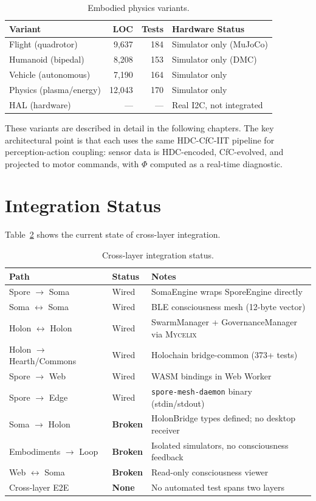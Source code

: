 \documentclass[12pt]{book}
\newcommand{\mycelix}{\textsc{Mycelix}}
\begin{document}
\begin{table}[H]
\centering
\caption{Embodied physics variants.}
\label{tab:embodied-variants}
\begin{tabular}{lrrl}
\toprule
\textbf{Variant} & \textbf{LOC} & \textbf{Tests} & \textbf{Hardware Status} \\
\midrule
Flight (quadrotor) & 9,637 & 184 & Simulator only (MuJoCo) \\
Humanoid (bipedal) & 8,208 & 153 & Simulator only (DMC) \\
Vehicle (autonomous) & 7,190 & 164 & Simulator only \\
Physics (plasma/energy) & 12,043 & 170 & Simulator only \\
HAL (hardware) & --- & --- & Real I2C, not integrated \\
\bottomrule
\end{tabular}
\end{table}

These variants are described in detail in the following chapters. The key architectural point is that each uses the same HDC-CfC-IIT pipeline for perception-action coupling: sensor data is HDC-encoded, CfC-evolved, and projected to motor commands, with $\Phi$ computed as a real-time diagnostic.

\section{Integration Status}

Table~\ref{tab:fractal-integration} shows the current state of cross-layer integration.

\begin{table}[H]
\centering
\caption{Cross-layer integration status.}
\label{tab:fractal-integration}
\begin{tabular}{llp{6cm}}
\toprule
\textbf{Path} & \textbf{Status} & \textbf{Notes} \\
\midrule
Spore $\to$ Soma & Wired & SomaEngine wraps SporeEngine directly \\
Soma $\leftrightarrow$ Soma & Wired & BLE consciousness mesh (12-byte vector) \\
Holon $\leftrightarrow$ Holon & Wired & SwarmManager + GovernanceManager via \mycelix{} \\
Holon $\to$ Hearth/Commons & Wired & Holochain bridge-common (373+ tests) \\
Spore $\to$ Web & Wired & WASM bindings in Web Worker \\
Spore $\to$ Edge & Wired & \texttt{spore-mesh-daemon} binary (stdin/stdout) \\
\midrule
Soma $\to$ Holon & \textbf{Broken} & HolonBridge types defined; no desktop receiver \\
Embodiments $\to$ Loop & \textbf{Broken} & Isolated simulators, no consciousness feedback \\
Web $\leftrightarrow$ Soma & \textbf{Broken} & Read-only consciousness viewer \\
Cross-layer E2E & \textbf{None} & No automated test spans two layers \\
\bottomrule
\end{tabular}
\end{table}
\end{document}

